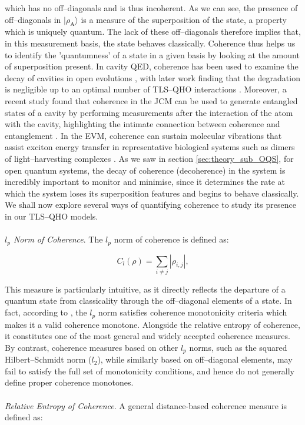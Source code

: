 \documentclass[11pt]{article}
\begin{document}
which has no off--diagonals and is thus incoherent. As we can see, the presence of off--diagonals in $|\rho_{\scriptscriptstyle \text{A}} \rangle$ is a measure of the superposition of the state, a property which is uniquely quantum. The lack of these off--diagonals therefore implies that, in this measurement basis, the state behaves classically. Coherence thus helps us to identify the 'quantumness' of a state in a given basis by looking at the amount of superposition present. In cavity QED, coherence has been used to examine the decay of cavities in open evolutions \cite{QResJCm2004-cQED_coherence}, with later work finding that the degradation is negligible up to an optimal number of TLS--QHO interactions \cite{CohEnt2020-Cavity_controlled_coherence}. Moreover, a recent study found that coherence in the JCM can be used to generate entangled states of a cavity by performing measurements after the interaction of the atom with the cavity, highlighting the intimate connection between coherence and entanglement \cite{CohEnt2024-2_JCM_coherence}. In the EVM, coherence can  sustain molecular vibrations that assist exciton energy transfer in representative biological systems such as dimers of light--harvesting complexes \cite{ExVib2014-Alexandra}. As we saw in section \ref{sec:theory_sub_OQS}, for open quantum systems, the decay of coherence (decoherence) in the system is incredibly important to monitor and minimise,  since it determines the rate at which the system loses its superposition features and begins to behave classically. We shall now explore several ways of quantifying coherence to study its presence in our TLS--QHO models. \\
\\
\textit{$l_p$ Norm of Coherence}. The $l_p$ norm of coherence is defined as:

\begin{equation}
    C_l(\rho) = \sum_{i\neq j} |\rho_{i,j}|, 
\end{equation}

This measure is particularly intuitive, as it directly reflects the departure of a quantum state from classicality through the off--diagonal elements of a state. In fact, according to \cite{Coherence2014-seed}, the $l_p$ norm satisfies coherence monotonicity criteria which makes it a valid coherence monotone. Alongside the relative entropy of coherence, it constitutes one of the most general and widely accepted coherence measures. By contrast, coherence measures based on other $l_p$ norms, such as the squared Hilbert–Schmidt norm ($l_2$), while similarly based on off--diagonal elements, may fail to satisfy the full set of monotonicity conditions, and hence do not generally define proper coherence monotones.\\
\\
\textit{Relative Entropy of Coherence}. A general distance-based coherence measure is defined as:
\end{document}
